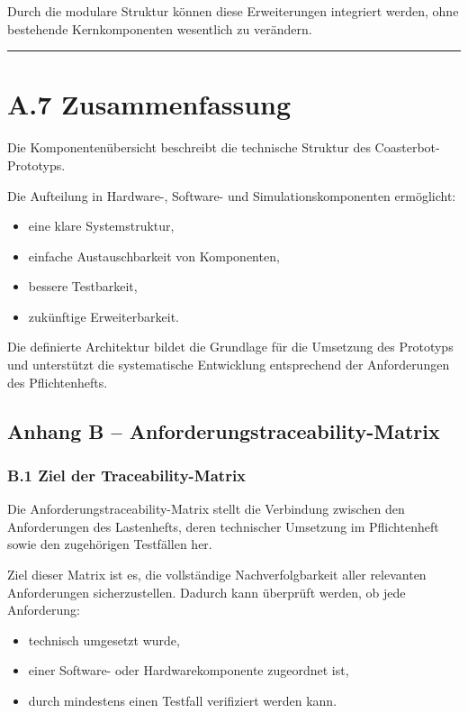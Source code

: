 \documentclass[
  a4paper,
  12pt,
  DIV=12,        %
  parskip=half,  %
  headings=small %
]{scrartcl}
\theoremstyle{definition}
\providecommand{\tightlist}{%
  \setlength{\itemsep}{0pt}\setlength{\parskip}{0pt}}
\theoremstyle{definition}
\providecommand{\tightlist}{%
  \setlength{\itemsep}{0pt}\setlength{\parskip}{0pt}}
\begin{document}
Durch die modulare Struktur können diese Erweiterungen integriert
werden, ohne bestehende Kernkomponenten wesentlich zu verändern.

\begin{center}\rule{0.5\linewidth}{0.5pt}\end{center}

\section{A.7 Zusammenfassung}\label{a.7-zusammenfassung}

Die Komponentenübersicht beschreibt die technische Struktur des
Coasterbot-Prototyps.

Die Aufteilung in Hardware-, Software- und Simulationskomponenten
ermöglicht:

\begin{itemize}
\tightlist
\item
  eine klare Systemstruktur,
\item
  einfache Austauschbarkeit von Komponenten,
\item
  bessere Testbarkeit,
\item
  zukünftige Erweiterbarkeit.
\end{itemize}

Die definierte Architektur bildet die Grundlage für die Umsetzung des
Prototyps und unterstützt die systematische Entwicklung entsprechend der
Anforderungen des Pflichtenhefts.

\subsection{Anhang B --
Anforderungstraceability-Matrix}\label{anhang-b-anforderungstraceability-matrix}

\subsubsection{B.1 Ziel der
Traceability-Matrix}\label{b.1-ziel-der-traceability-matrix}

Die Anforderungstraceability-Matrix stellt die Verbindung zwischen den
Anforderungen des Lastenhefts, deren technischer Umsetzung im
Pflichtenheft sowie den zugehörigen Testfällen her.

Ziel dieser Matrix ist es, die vollständige Nachverfolgbarkeit aller
relevanten Anforderungen sicherzustellen. Dadurch kann überprüft werden,
ob jede Anforderung:

\begin{itemize}
\tightlist
\item
  technisch umgesetzt wurde,
\item
  einer Software- oder Hardwarekomponente zugeordnet ist,
\item
  durch mindestens einen Testfall verifiziert werden kann.
\end{itemize}
\end{document}
